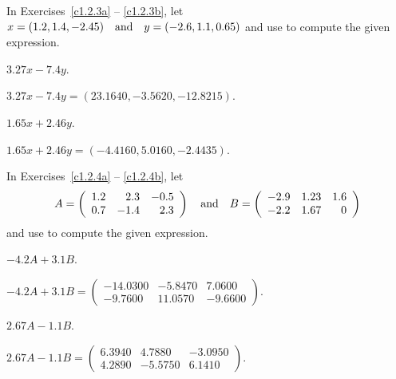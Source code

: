 \documentclass{ximera}
\begin{document}
\noindent In Exercises~\ref{c1.2.3a} -- \ref{c1.2.3b}, let 
$x=(1.2,1.4,-2.45) \quad\mbox{and}\quad y=(-2.6,1.1,0.65)$ and use \Matlab to compute the 
given expression.
\begin{exercise}  \label{c1.2.3a}
$3.27x-7.4y$.

\begin{solution}
$3.27x - 7.4y = (23.1640, -3.5620, -12.8215)$.

\end{solution}
\end{exercise}
\begin{exercise}  \label{c1.2.3b}
$1.65x+2.46y$.

\begin{solution}
$1.65x + 2.46y = (-4.4160, 5.0160, -2.4435)$.

\end{solution}
\end{exercise}

\noindent In Exercises~\ref{c1.2.4a} -- \ref{c1.2.4b}, let 
\[
A = \left(\begin{array}{rrr} 1.2 & 2.3 & -0.5\\ 0.7 & -1.4 & 2.3
\end{array}\right) \quad\mbox{and}\quad
B = \left(\begin{array}{rrr} -2.9 & 1.23 & 1.6\\ -2.2 & 1.67 & 0
\end{array}\right)
\]
and use \Matlab to compute the given expression.
\begin{exercise}  \label{c1.2.4a}
$-4.2A+3.1B$.

\begin{solution}
$-4.2A + 3.1B = \left(\begin{array}{rrr} 
-14.0300 & -5.8470 &    7.0600 \\
 -9.7600 & 11.0570 &   -9.6600\end{array}\right)$.

\end{solution}
\end{exercise}
\begin{exercise}  \label{c1.2.4b}
$2.67A-1.1B$.

\begin{solution}
$2.67A - 1.1B = \left(\begin{array}{rrr} 
    6.3940  &  4.7880 &  -3.0950\\
    4.2890  & -5.5750 &   6.1410 \end{array}\right)$.




\end{solution}
\end{exercise}
\end{document}

